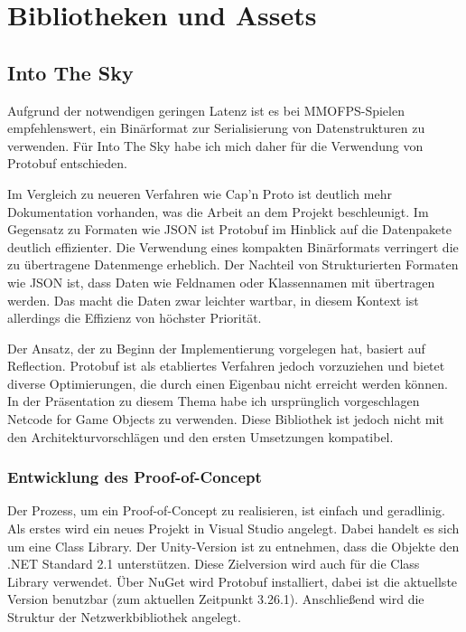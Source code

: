 \chapter{Bibliotheken und Assets}

\section{Into The Sky}

Aufgrund der notwendigen geringen Latenz ist es bei MMOFPS-Spielen empfehlenswert, ein Binärformat zur Serialisierung von Datenstrukturen zu verwenden. Für Into The Sky habe ich mich daher für die Verwendung von Protobuf entschieden.

Im Vergleich zu neueren Verfahren wie Cap'n Proto ist deutlich mehr Dokumentation vorhanden, was die Arbeit an dem Projekt beschleunigt. Im Gegensatz zu Formaten wie JSON ist Protobuf im Hinblick auf die Datenpakete deutlich effizienter. Die Verwendung eines kompakten Binärformats verringert die zu übertragene Datenmenge erheblich. Der Nachteil von Strukturierten Formaten wie JSON ist, dass Daten wie Feldnamen oder Klassennamen mit übertragen werden. Das macht die Daten zwar leichter wartbar, in diesem Kontext ist allerdings die Effizienz von höchster Priorität.

Der Ansatz, der zu Beginn der Implementierung vorgelegen hat, basiert auf Reflection. Protobuf ist als etabliertes Verfahren jedoch vorzuziehen und bietet diverse Optimierungen, die durch einen Eigenbau nicht erreicht werden können. In der Präsentation zu diesem Thema habe ich ursprünglich vorgeschlagen Netcode for Game Objects zu verwenden. Diese Bibliothek ist jedoch nicht mit den Architekturvorschlägen und den ersten Umsetzungen kompatibel.

\subsection{Entwicklung des Proof-of-Concept}

Der Prozess, um ein Proof-of-Concept zu realisieren, ist einfach und geradlinig. Als erstes wird ein  neues Projekt in Visual Studio angelegt. Dabei handelt es sich um eine Class Library. Der Unity-Version ist zu entnehmen, dass die Objekte den .NET Standard 2.1 unterstützen. Diese Zielversion wird auch für die Class Library verwendet. Über NuGet wird Protobuf installiert, dabei ist die aktuellste Version benutzbar (zum aktuellen Zeitpunkt 3.26.1). Anschließend wird die Struktur der Netzwerkbibliothek angelegt.

